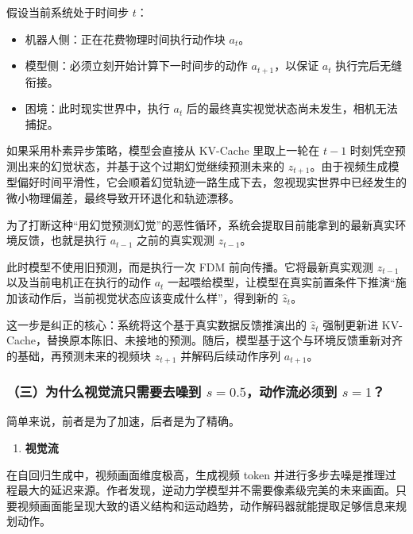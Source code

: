 假设当前系统处于时间步 \(t\)：

\begin{itemize}
\tightlist
\item
  机器人侧：正在花费物理时间执行动作块 \(a_t\)。
\item
  模型侧：必须立刻开始计算下一时间步的动作 \(a_{t+1}\)，以保证 \(a_t\) 执行完后无缝衔接。
\item
  困境：此时现实世界中，执行 \(a_t\) 后的最终真实视觉状态尚未发生，相机无法捕捉。
\end{itemize}

如果采用朴素异步策略，模型会直接从 KV-Cache 里取上一轮在 \(t-1\) 时刻凭空预测出来的幻觉状态，并基于这个过期幻觉继续预测未来的 \(z_{t+1}\)。由于视频生成模型偏好时间平滑性，它会顺着幻觉轨迹一路生成下去，忽视现实世界中已经发生的微小物理偏差，最终导致开环退化和轨迹漂移。

为了打断这种``用幻觉预测幻觉''的恶性循环，系统会提取目前能拿到的最新真实环境反馈，也就是执行 \(a_{t-1}\) 之前的真实观测 \(z_{t-1}\)。

此时模型不使用旧预测，而是执行一次 FDM 前向传播。它将最新真实观测 \(z_{t-1}\) 以及当前电机正在执行的动作 \(a_t\) 一起喂给模型，让模型在真实前置条件下推演``施加该动作后，当前视觉状态应该变成什么样''，得到新的 \(\hat{z}_t\)。

这一步是纠正的核心：系统将这个基于真实数据反馈推演出的 \(\hat{z}_t\) 强制更新进 KV-Cache，替换原本陈旧、未接地的预测。随后，模型基于这个与环境反馈重新对齐的基础，再预测未来的视频块 \(z_{t+1}\) 并解码后续动作序列 \(a_{t+1}\)。

\hypertarget{ux4e09ux4e3aux4ec0ux4e48ux89c6ux89c9ux6d41ux53eaux9700ux8981ux53bbux566aux5230-s0.5ux52a8ux4f5cux6d41ux5fc5ux987bux5230-s1}{%
\subsubsection{\texorpdfstring{（三）为什么视觉流只需要去噪到 \(s=0.5\)，动作流必须到 \(s=1\)？}{（三）为什么视觉流只需要去噪到 s=0.5，动作流必须到 s=1？}}\label{ux4e09ux4e3aux4ec0ux4e48ux89c6ux89c9ux6d41ux53eaux9700ux8981ux53bbux566aux5230-s0.5ux52a8ux4f5cux6d41ux5fc5ux987bux5230-s1}}

简单来说，前者是为了加速，后者是为了精确。

\begin{enumerate}
\def\labelenumi{\arabic{enumi}.}
\tightlist
\item
  \textbf{视觉流}
\end{enumerate}

在自回归生成中，视频画面维度极高，生成视频 token 并进行多步去噪是推理过程最大的延迟来源。作者发现，逆动力学模型并不需要像素级完美的未来画面。只要视频画面能呈现大致的语义结构和运动趋势，动作解码器就能提取足够信息来规划动作。

